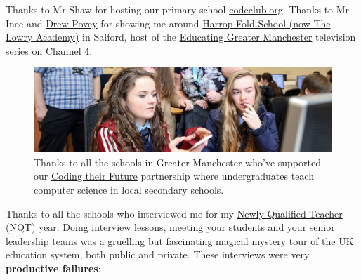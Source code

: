 \documentclass[
]{book}
\begin{document}
Thanks to Mr Shaw for hosting our primary school \href{https://codeclub.org/en/}{codeclub.org}. Thanks to Mr Ince and \href{https://www.digitalspy.com/tv/a34573273/educating-greater-manchester-drew-povey-resignation-explained/}{Drew Povey} for showing me around \href{https://en.wikipedia.org/wiki/The_Lowry_Academy}{Harrop Fold School (now The Lowry Academy)} in Salford, host of the \href{https://www.channel4.com/programmes/educating-greater-manchester}{Educating Greater Manchester} television series on Channel 4. \citep{povey}

\begin{figure}

{\centering \includegraphics[width=1\linewidth]{images/schools-banner} 

}

\caption{Thanks to all the schools in Greater Manchester who've supported our \href{https://personalpages.manchester.ac.uk/staff/duncan.hull/coding-their-future}{Coding their Future} partnership where undergraduates teach computer science in local secondary schools.}\label{fig:coding-their-future-fig}
\end{figure}



Thanks to all the schools who interviewed me for my \href{https://en.wikipedia.org/wiki/Newly_qualified_teacher}{Newly Qualified Teacher} (NQT) year. Doing interview lessons, meeting your students and your senior leadership teams was a gruelling but fascinating magical mystery tour of the UK education system, both public and private. These interviews were very \textbf{productive failures}:
\end{document}
